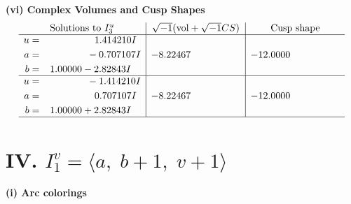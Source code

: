 \documentclass[1p]{elsarticle_modified}
\theoremstyle{definition}
\newcommand{\I}{\sqrt{-1}}
\begin{document}
\newpage\flushleft \textbf{(vi) Complex Volumes and Cusp Shapes}
$$\begin{array}{c|c|c}  
\text{Solutions to }I^u_{3}& \I (\text{vol} + \sqrt{-1}CS) & \text{Cusp shape}\\
 \hline 
\begin{aligned}
u &= \phantom{-0.000000 -}1.414210 I \\
a &= \phantom{-0.000000 } -0.707107 I \\
b &= \phantom{-}1.00000 - 2.82843 I\end{aligned}
 & -8.22467\phantom{ +0.000000I} & -12.0000\phantom{ +0.000000I} \\ \hline\begin{aligned}
u &= \phantom{-0.000000 } -1.414210 I \\
a &= \phantom{-0.000000 -}0.707107 I \\
b &= \phantom{-}1.00000 + 2.82843 I\end{aligned}
 & -8.22467\phantom{ +0.000000I} & -12.0000\phantom{ +0.000000I}\\
 \hline 
 \end{array}$$\newpage\newpage\renewcommand{\arraystretch}{1}
\centering \section*{IV. $I^v_{1}= \langle a,\;b+1,\;v+1 \rangle$}
\flushleft \textbf{(i) Arc colorings}\\
\end{document}
